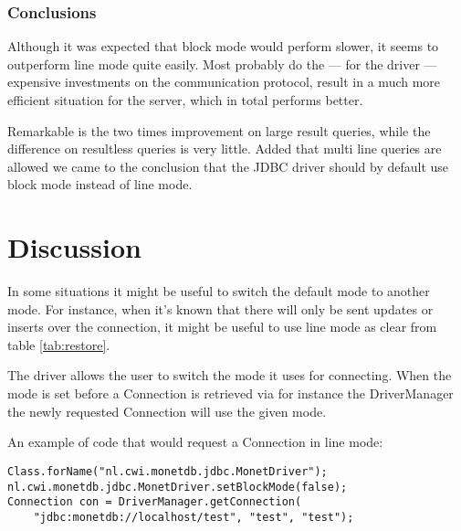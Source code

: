 \documentclass{article}
\begin{document}
\subsubsection{Conclusions}

Although it was expected that block mode would perform slower, it
seems to outperform line mode quite easily. Most probably do the ---
for the driver --- expensive investments on the communication
protocol, result in a much more efficient situation for the server, which
in total performs better.

Remarkable is the two times improvement on large result queries, while
the difference on resultless queries is very little. Added that multi line
queries are allowed we came to the conclusion that the JDBC driver
should by default use block mode instead of line mode.


\section{Discussion}

In some situations it might be useful to switch the default mode to
another mode. For instance, when it's known that there will only be
sent updates or inserts over the connection, it might be useful to
use line mode as clear from table \ref{tab:restore}.

The driver allows the user to switch the mode it uses for connecting.
When the mode is set before a \textsf{Connection} is retrieved via
for instance the \textsf{DriverManager} the newly requested
\textsf{Connection} will use the given mode.

An example of code that would request a \textsf{Connection} in line
mode:
\begin{verbatim}
Class.forName("nl.cwi.monetdb.jdbc.MonetDriver");
nl.cwi.monetdb.jdbc.MonetDriver.setBlockMode(false);
Connection con = DriverManager.getConnection(
 	"jdbc:monetdb://localhost/test", "test", "test");
\end{verbatim}
\end{document}
